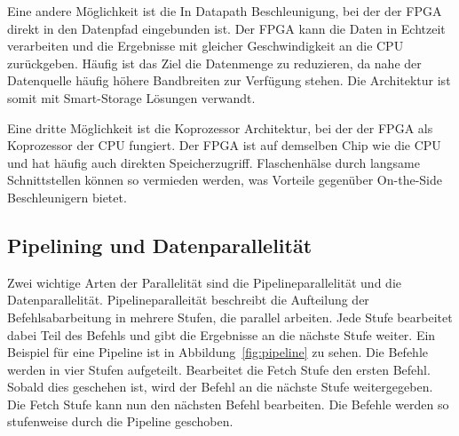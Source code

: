 \documentclass[conference]{IEEEtran}
\begin{document}
Eine andere Möglichkeit ist die In Datapath Beschleunigung, bei der der FPGA direkt in den Datenpfad eingebunden ist. Der FPGA kann die Daten in Echtzeit
verarbeiten und die Ergebnisse mit gleicher Geschwindigkeit an die CPU zurückgeben. Häufig ist das Ziel die Datenmenge zu reduzieren, da nahe der
Datenquelle häufig höhere Bandbreiten zur Verfügung stehen. Die Architektur ist somit mit Smart-Storage Lösungen verwandt.

Eine dritte Möglichkeit ist die Koprozessor Architektur, bei der der FPGA als Koprozessor der CPU fungiert. Der FPGA ist auf demselben Chip wie die CPU
und hat häufig auch direkten Speicherzugriff. Flaschenhälse durch langsame Schnittstellen können so vermieden werden, was Vorteile gegenüber
\mbox{On-the-Side} Beschleunigern bietet.







\subsection{Pipelining und Datenparallelität}
Zwei wichtige Arten der Parallelität sind die Pipelineparallelität und die Datenparallelität. Pipelineparalleität beschreibt die Aufteilung der Befehlsabarbeitung
in mehrere Stufen, die parallel arbeiten. Jede Stufe bearbeitet dabei Teil des Befehls und gibt die Ergebnisse an die nächste Stufe weiter.
Ein Beispiel für eine Pipeline ist in Abbildung~\ref{fig:pipeline} zu sehen. Die Befehle werden in vier Stufen aufgeteilt. Bearbeitet die Fetch Stufe den ersten Befehl.
Sobald dies geschehen ist, wird der Befehl an die nächste Stufe weitergegeben. Die Fetch Stufe kann nun den nächsten Befehl bearbeiten. Die Befehle werden so stufenweise
durch die Pipeline geschoben.
\end{document}
